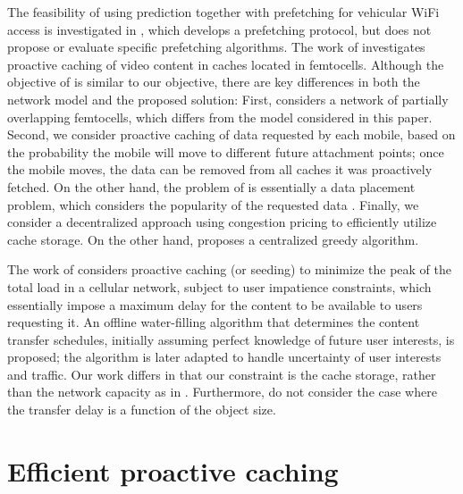 \documentclass[conference]{IEEEtran}
\newcommand{\mynote}[1]{{{\medskip
\footnotesize \em \noindent Note: #1}}\medskip}
\renewcommand{\mynote}[1]{}
\begin{document}
The feasibility of using prediction together with prefetching for vehicular WiFi access is investigated in \cite{Des++09}, which  develops  a prefetching protocol, but does not propose or evaluate specific prefetching algorithms.
The work of \cite{Gol++12} investigates  proactive caching of video content in caches located in femtocells.
Although the objective of \cite{Gol++12} is similar to our objective, there are key differences in both the network model and the proposed solution:
First, \cite{Gol++12} considers a network of partially overlapping femtocells, which differs from the  model considered in this paper.
Second, we consider proactive caching of data requested by each mobile, based on the probability the mobile will move to different future attachment points; once the mobile moves, the data can be removed from all caches  it was proactively fetched. On the other hand, the problem of \cite{Gol++12} is essentially a data placement problem, which considers the popularity of the requested data \cite{App++10}. Finally, we consider a decentralized approach using   congestion pricing  to efficiently utilize cache storage. On the other hand, \cite{Gol++12} proposes a centralized greedy algorithm.
\mynote{Check if it is worth writing something like the following:
On the other hand, our proposed approach achieves performance that is very close, and in some cases coincides with that of the optimal, for the case of a flat cache structure, and has performance which is very close to an oracle.
}
The work of \cite{Mal++12} considers proactive caching (or seeding) to minimize the peak of the total load in a cellular network, subject to user impatience constraints, which essentially impose a maximum delay for the content to be available to users requesting it. An offline water-filling algorithm that determines the content transfer schedules, initially assuming perfect knowledge of future user interests, is proposed; the algorithm is later adapted to handle uncertainty of user interests and traffic.
Our work differs in that our constraint is the cache storage, rather than the network capacity as in \cite{Mal++12}. Furthermore,  \cite{Gol++12,Mal++12} do not consider the case where the transfer delay is a function of the object size.

\vspace{-0.09in}
\section{Efficient proactive caching}
\label{sec:epc}
\vspace{-0.03in}
\end{document}
